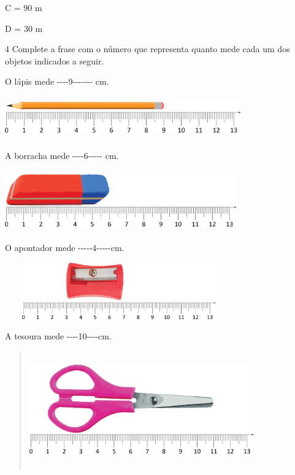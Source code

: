 \begin{escolha}
C = 90 m

D = 30 m

\num{4} Complete a frase com o número que representa quanto mede cada um dos
objetos indicados a seguir.

\begin{escolha}

\item
  O lápis mede -\/-\/-\/-9-\/-\/-\/-\/-\/-\/- cm.

  \includegraphics[width=4.00868in,height=0.70839in]{media/image42.png}



\item
  A borracha mede -\/-\/-\/-6-\/-\/-\/-\/- cm.

  \includegraphics[width=3.93367in,height=1.02509in]{media/image43.png}


\item
  O apontador mede -\/-\/-\/-\/-4-\/-\/-\/-\/-cm.

  \includegraphics[width=3.87534in,height=0.95842in]{media/image44.png}


\item
  A tesoura mede -\/-\/-\/-10-\/-\/-\/-cm.

  \begin{quote}
  \includegraphics[width=3.81700in,height=1.97517in]{media/image45.png}
\end{quote}


\end{escolha}
\end{escolha}
